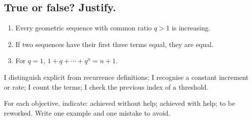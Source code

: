 \subsection*{True or false? Justify.}\label{C01-VF}
\begin{enumerate}
\item Every geometric sequence with common ratio $q>1$ is increasing.
\item If two sequences have their first three terms equal, they are equal.
\item For $q=1$, $1+q+\cdots+q^n=n+1$.
\end{enumerate}
\begin{keypoint}I distinguish explicit from recurrence definitions; I recognise a constant increment or rate; I count the terms; I check the previous index of a threshold.

For each objective, indicate: achieved without help; achieved with help; to be reworked. Write one example and one mistake to avoid.\end{keypoint}
\endgroup
\ifmxteacher{}\fi
